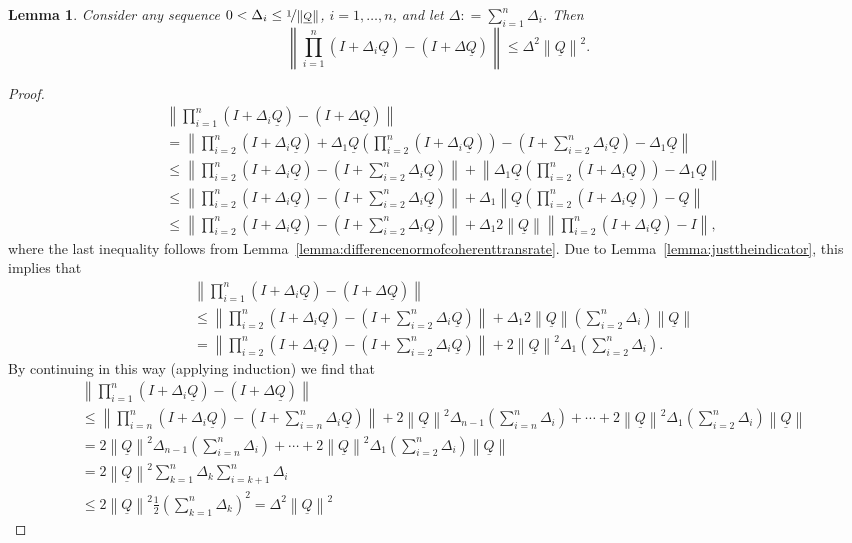 \documentclass[a4paper,reqno]{amsart}
\newtheorem{lemma}[theorem]{Lemma}
\newcommand{\lrate}{\underline{Q}}
\newcommand{\norm}[1]{\left\lVert #1 \right\rVert}
\newcommand{\coloneqq}{:\!=}
\begin{document}
\begin{lemma}\label{lemma:justthelinearpart}
Consider any sequence $0<\Delta_i\leq\nicefrac{1}{\norm{\lrate}}$, $i=1,\dots,n$, and let $\Delta\coloneqq\sum_{i=1}^n\Delta_i$. Then
\begin{equation*}
\norm{\prod_{i=1}^n(I+\Delta_i\lrate)-(I+\Delta\lrate)}\leq\Delta^2\norm{\lrate}^2.
\end{equation*}
\end{lemma}
\begin{proof}
\begin{align*}
&\norm{\prod_{i=1}^n(I+\Delta_i\lrate)-(I+\Delta\lrate)}\\
&=\norm{\prod_{i=2}^n(I+\Delta_i\lrate)+\Delta_1\lrate\left(\prod_{i=2}^n(I+\Delta_i\lrate)\right)-(I+\sum_{i=2}^n\Delta_i\lrate)-\Delta_1\lrate}\\
&\leq\norm{\prod_{i=2}^n(I+\Delta_i\lrate)-(I+\sum_{i=2}^n\Delta_i\lrate)}+\norm{\Delta_1\lrate\left(\prod_{i=2}^n(I+\Delta_i\lrate)\right)-\Delta_1\lrate}\\
&\leq\norm{\prod_{i=2}^n(I+\Delta_i\lrate)-(I+\sum_{i=2}^n\Delta_i\lrate)}+\Delta_1\norm{\lrate\left(\prod_{i=2}^n(I+\Delta_i\lrate)\right)-\lrate}\\
&\leq\norm{\prod_{i=2}^n(I+\Delta_i\lrate)-(I+\sum_{i=2}^n\Delta_i\lrate)}+\Delta_1 2\norm{\lrate}\norm{\prod_{i=2}^n(I+\Delta_i\lrate)-I},
\end{align*}
where the last inequality follows from Lemma~\ref{lemma:differencenormofcoherenttransrate}. Due to Lemma~\ref{lemma:justtheindicator}, this implies that
\begin{align*}
&\norm{\prod_{i=1}^n(I+\Delta_i\lrate)-(I+\Delta\lrate)}\\
&\leq\norm{\prod_{i=2}^n(I+\Delta_i\lrate)-(I+\sum_{i=2}^n\Delta_i\lrate)}+\Delta_1 2\norm{\lrate}\left(\sum_{i=2}^n\Delta_i\right)\norm{\lrate}\\
&=\norm{\prod_{i=2}^n(I+\Delta_i\lrate)-(I+\sum_{i=2}^n\Delta_i\lrate)}+2\norm{\lrate}^2\Delta_1\left(\sum_{i=2}^n\Delta_i\right).
\end{align*}
By continuing in this way (applying induction) we find that
\begin{align*}
&\norm{\prod_{i=1}^n(I+\Delta_i\lrate)-(I+\Delta\lrate)}\\
&\leq
\norm{\prod_{i=n}^n(I+\Delta_i\lrate)-(I+\sum_{i=n}^n\Delta_i\lrate)}
+2\norm{\lrate}^2\Delta_{n-1}\left(\sum_{i=n}^n\Delta_i\right)
+\cdots
+2\norm{\lrate}^2\Delta_1\left(\sum_{i=2}^n\Delta_i\right)\norm{\lrate}\\
&=2\norm{\lrate}^2\Delta_{n-1}\left(\sum_{i=n}^n\Delta_i\right)
+\cdots
+2\norm{\lrate}^2\Delta_1\left(\sum_{i=2}^n\Delta_i\right)\norm{\lrate}\\
&=2\norm{\lrate}^2\sum_{k=1}^n\Delta_k\sum_{i=k+1}^n\Delta_i\\
&\leq2\norm{\lrate}^2\frac{1}{2}\left(\sum_{k=1}^n\Delta_k\right)^2=\Delta^2\norm{\lrate}^2
\end{align*}
\end{proof}
\end{document}
